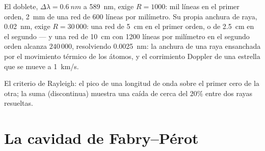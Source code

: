 \begin{example}\label{ex:b2:gratings:sodium}
El doblete, $\Delta\lambda = \qty{0.6}{nm}$ a \qty{589}{nm}, exige $R = 1000$: mil
líneas en el primer orden, \qty{2}{mm} de una red de 600 líneas por
milímetro. Su propia anchura de raya, \qty{0.02}{nm}, exige $R = 30\,000$: una red de \qty{5}{cm}
en el primer orden, o de \qty{2.5}{cm} en el segundo --- y una red de
\qty{10}{cm} con 1200 líneas por milímetro en el segundo orden alcanza
$240\,000$, resolviendo \qty{0.0025}{nm}: la anchura de una raya ensanchada por
el movimiento térmico de los átomos, y el corrimiento Doppler de una estrella que se mueve
a \qty{1}{km/s}.
\end{example}

\begin{omfigure}

{\small El criterio de Rayleigh: el pico de una longitud de onda sobre el primer
cero de la otra; la suma (discontinua) muestra una caída de cerca del $20\%$ entre
dos rayas resueltas.}
\end{omfigure}

\section{La cavidad de Fabry--Pérot}


